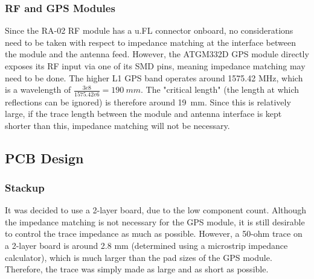 \subsubsection{RF and GPS Modules}
Since the RA-02 RF module has a u.FL connector onboard, no considerations need to be taken with respect to impedance matching at the interface between the module and the antenna feed. However, the ATGM332D GPS module directly exposes its RF input via one of its SMD pins, meaning impedance matching may need to be done. The higher L1 GPS band operates around 1575.42 MHz, which is a wavelength of $\frac{3e8}{1575.42e6} = \SI{190}{mm}$. The "critical length" (the length at which reflections can be ignored) is therefore around \SI{19}{mm}. Since this is relatively large, if the trace length between the module and antenna interface is kept shorter than this, impedance matching will not be necessary.

\subsection{PCB Design}
\subsubsection{Stackup}
It was decided to use a 2-layer board, due to the low component count. Although the impedance matching is not necessary for the GPS module, it is still desirable to control the trace impedance as much as possible. However, a 50-ohm trace on a 2-layer board is around 2.8 mm (determined using a microstrip impedance calculator), which is much larger than the pad sizes of the GPS module. Therefore, the trace was simply made as large and as short as possible.

